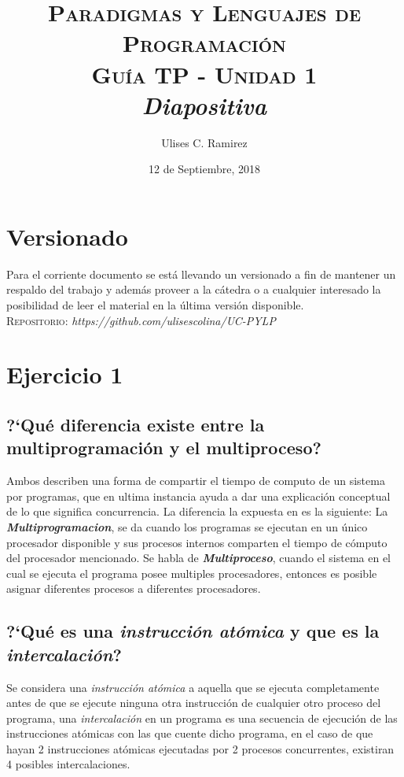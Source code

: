 \documentclass{article}
\title{\textsc{Paradigmas y Lenguajes de Programaci\'on\\Gu\'ia TP - Unidad 1}\\\textit{Diapositiva}}
\author{Ulises C. Ramirez}
\date{12 de Septiembre, 2018}
\begin{document}
\maketitle
{}
\newpage
\section*{Versionado}
Para el corriente documento se est\'a llevando un versionado a fin de mantener un respaldo del trabajo y adem\'as proveer a la c\'atedra o a cualquier interesado la posibilidad de leer el material en la \'ultima versi\'on disponible.\\

\textsc{Repositorio}: \textit{https://github.com/ulisescolina/UC-PYLP}

\tableofcontents
{}
\newpage

\section{Ejercicio 1}
\label{sec:e1}
\subsection{?`Qu\'e diferencia existe entre la multiprogramaci\'on y el multiproceso?}
Ambos describen una forma de compartir el tiempo de computo de un sistema por programas, que en ultima instancia ayuda a dar una explicaci\'on conceptual de lo que significa concurrencia. La diferencia la expuesta en \cite{gortazarbellas} es la siguiente:
La \textbf{\textit{Multiprogramacion}}, se da cuando los programas se ejecutan en un \'unico procesador disponible y sus procesos internos comparten el tiempo de c\'omputo del procesador mencionado. Se habla de \textbf{\textit{Multiproceso}}, cuando el sistema en el cual se ejecuta el programa posee multiples procesadores, entonces es posible asignar diferentes procesos a diferentes procesadores.

\subsection{?`Qu\'e es una \textit{instrucci\'on at\'omica} y que es la \textit{intercalaci\'on}?}
\label{sub:atomicaintercalacion}
Se considera una \textit{instrucci\'on at\'omica} \cite{gortazarbellas} a aquella que se ejecuta completamente antes de que se ejecute ninguna otra instrucci\'on de cualquier otro proceso del programa, una \textit{intercalaci\'on} en un programa es una secuencia de ejecuci\'on de las instrucciones at\'omicas con las que cuente dicho programa, en el caso de que hayan 2 instrucciones at\'omicas ejecutadas por 2 procesos concurrentes, existiran 4 posibles intercalaciones.
\end{document}

